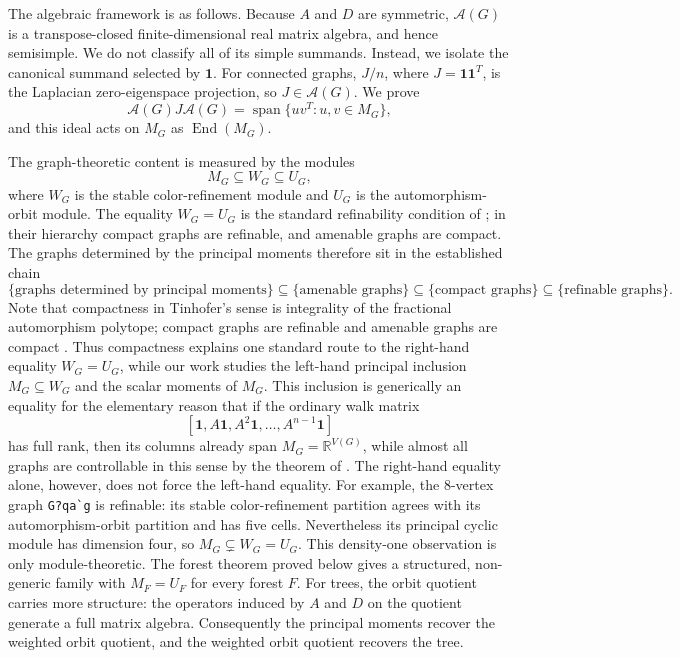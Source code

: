 \documentclass[a4paper,fleqn]{cas-sc}
\theoremstyle{definition}
\theoremstyle{remark}
\newcommand{\one}{\mathbf 1}
\begin{document}
The algebraic framework is as follows.  Because $A$ and $D$ are symmetric,
$\mathcal A(G)$ is a transpose-closed finite-dimensional real matrix algebra,
and hence semisimple.  We do not classify all of its simple summands.  Instead,
we isolate the canonical summand selected by $\mathbf1$.  For connected graphs,
$J/n$, where $J=\mathbf1\mathbf1^T$, is the Laplacian zero-eigenspace projection,
so $J\in\mathcal A(G)$.  We prove
\[
        \mathcal A(G)J\mathcal A(G)
        =\operatorname{span}\{uv^T:u,v\in M_G\},
\]
and this ideal acts on $M_G$ as $\operatorname{End}(M_G)$.

The graph-theoretic content is measured by the modules
\[
        M_G\subseteq W_G\subseteq U_G,
\]
where $W_G$ is the stable color-refinement module and $U_G$ is the automorphism-orbit
module.  The equality $W_G=U_G$ is the standard refinability condition of
\citet{ArvindKoblerRattanVerbitsky2017}; in their hierarchy compact graphs are
refinable, and amenable graphs are compact.  The graphs determined by the
principal moments therefore sit in the established chain
\[
        \{\text{graphs determined by principal moments}\}
        \subseteq \{\text{amenable graphs}\}
        \subseteq \{\text{compact graphs}\}
        \subseteq \{\text{refinable graphs}\}.
\]
Note that compactness in Tinhofer's sense is integrality of the fractional automorphism polytope;
compact graphs are refinable and amenable graphs are compact
\citep{Tinhofer1991,ArvindKoblerRattanVerbitsky2017}. Thus compactness explains
one standard route to the right-hand equality $W_G=U_G$, while our work studies
the left-hand principal inclusion $M_G\subseteq W_G$ and the scalar moments of
$M_G$.  This inclusion is generically an equality for the elementary reason that
if the ordinary walk matrix
\[
        [\one,A\one,A^2\one,\ldots,A^{n-1}\one]
\]
has full rank, then its columns already span $M_G=\mathbb R^{V(G)}$, while almost all graphs are controllable in this sense by the theorem of \citet{ORourkeTouri2016}.
The right-hand equality alone, however, does not force the left-hand equality.
For example, the 8-vertex graph \verb|G?qa`g| is refinable: its stable
color-refinement partition agrees with its automorphism-orbit partition and has
five cells.  Nevertheless its principal cyclic module has dimension four, so
$M_G\subsetneq W_G=U_G$.  This density-one observation is only module-theoretic.
The forest theorem proved below gives a structured, non-generic family with
$M_F=U_F$ for every forest $F$.  For trees, the orbit quotient carries more structure:
the operators induced by $A$ and $D$ on the quotient generate a full matrix algebra.
Consequently the principal moments recover the weighted orbit quotient, and the
weighted orbit quotient recovers the tree.
\end{document}
